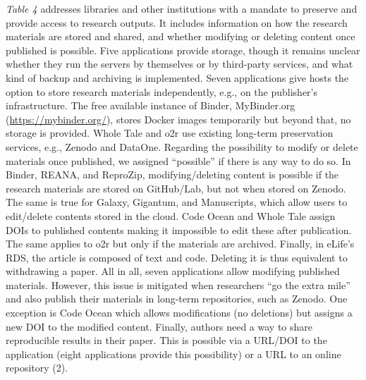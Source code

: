 \documentclass[onecolumn]{article}
\begin{document}
\emph{Table 4} addresses libraries and other institutions with a mandate
to preserve and provide access to research outputs. It includes
information on how the research materials are stored and shared, and
whether modifying or deleting content once published is possible. Five
applications provide storage, though it remains unclear whether they run
the servers by themselves or by third-party services, and what kind of
backup and archiving is implemented. Seven applications give hosts the
option to store research materials independently, e.g., on the
publisher's infrastructure. The free available instance of Binder,
MyBinder.org (\url{https://mybinder.org/}), stores Docker images
temporarily but beyond that, no storage is provided. Whole Tale and o2r
use existing long-term preservation services, e.g., Zenodo and DataOne.
Regarding the possibility to modify or delete materials once published,
we assigned ``possible'' if there is any way to do so. In Binder, REANA,
and ReproZip, modifying/deleting content is possible if the research
materials are stored on GitHub/Lab, but not when stored on Zenodo. The
same is true for Galaxy, Gigantum, and Manuscripts, which allow users to
edit/delete contents stored in the cloud. Code Ocean and Whole Tale
assign DOIs to published contents making it impossible to edit these
after publication. The same applies to o2r but only if the materials are
archived. Finally, in eLife's RDS, the article is composed of text and
code. Deleting it is thus equivalent to withdrawing a paper. All in all,
seven applications allow modifying published materials. However, this
issue is mitigated when researchers ``go the extra mile'' and also
publish their materials in long-term repositories, such as Zenodo. One
exception is Code Ocean which allows modifications (no deletions) but
assigns a new DOI to the modified content. Finally, authors need a way
to share reproducible results in their paper. This is possible via a
URL/DOI to the application (eight applications provide this possibility)
or a URL to an online repository (2).
\end{document}
